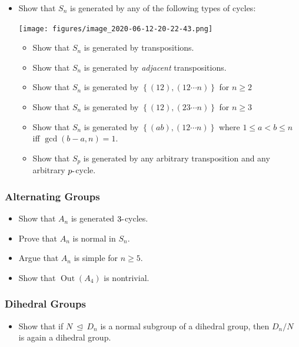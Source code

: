 \begin{itemize}
\item
  Show that \(S_n\) is generated by any of the following types of
  cycles:

  \texttt{[image: figures/image\_2020-06-12-20-22-43.png]}

  \begin{itemize}
  \tightlist
  \item
    Show that \(S_n\) is generated by transpositions.
  \item
    Show that \(S_n\) is generated by \emph{adjacent} transpositions.
  \item
    Show that \(S_n\) is generated by
    \(\left\{{(12), (12\cdots n)}\right\}\) for \(n\geq 2\)
  \item
    Show that \(S_n\) is generated by
    \(\left\{{(12), (23\cdots n)}\right\}\) for \(n\geq 3\)
  \item
    Show that \(S_n\) is generated by
    \(\left\{{(ab), (12\cdots n)}\right\}\) where \(1\leq a<b\leq n\)
    iff \(\gcd(b-a, n) = 1\).
  \item
    Show that \(S_p\) is generated by any arbitrary transposition and
    any arbitrary \(p{\hbox{-}}\)cycle.
  \end{itemize}
\end{itemize}

\hypertarget{alternating-groups}{%
\subsubsection{Alternating Groups}\label{alternating-groups}}

\begin{itemize}
\tightlist
\item
  Show that \(A_n\) is generated \(3{\hbox{-}}\)cycles.
\item
  Prove that \(A_n\) is normal in \(S_n\).
\item
  Argue that \(A_n\) is simple for \(n \geq 5\).
\item
  Show that \({\operatorname{Out}}(A_4)\) is nontrivial.
\end{itemize}

\hypertarget{dihedral-groups}{%
\subsubsection{Dihedral Groups}\label{dihedral-groups}}

\begin{itemize}
\tightlist
\item
  Show that if \(N{~\trianglelefteq~}D_n\) is a normal subgroup of a
  dihedral group, then \(D_n/N\) is again a dihedral group.
\end{itemize}

